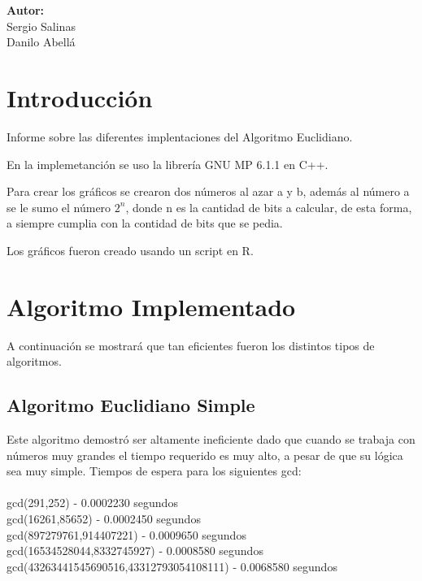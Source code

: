 \documentclass[12pt,letterpaper]{scrartcl}
\begin{document}
\begin{titlepage}
\begin{center}
\begin{minipage}[l]{0.4\textwidth}
	\begin{flushright}

		\textbf{\textsf{Autor:}}\\
		\linespread{1}
		\large Sergio Salinas\\
		\large Danilo Abellá\\

	\end{flushright}
\end{minipage}

\end{center}

\end{titlepage}



\newpage
\section*{Introducción}

Informe sobre las diferentes implentaciones del Algoritmo Euclidiano.

En la implemetanción se uso la librería GNU MP 6.1.1 en C++.

Para crear los gráficos se crearon dos números al azar a y b, además al número a se le sumo el número $2^n$, donde n es la cantidad de bits a calcular, de esta forma, a siempre cumplia con la contidad de bits que se pedia.

Los gráficos fueron creado usando un script en R.


\section{Algoritmo Implementado}

A continuación se mostrará que tan eficientes fueron los distintos tipos de algoritmos.

\subsection{Algoritmo Euclidiano Simple}

Este algoritmo demostró ser altamente ineficiente dado que cuando se trabaja con números muy grandes el tiempo requerido es muy alto, a pesar de que su lógica sea muy simple.
Tiempos de espera para los siguientes gcd:
\\\\
gcd(291,252) - 0.0002230 segundos
\\
gcd(16261,85652) - 0.0002450 segundos
\\
gcd(897279761,914407221) - 0.0009650 segundos
\\
gcd(16534528044,8332745927) - 0.0008580 segundos
\\
gcd(43263441545690516,43312793054108111) - 0.0068580 segundos
\end{document}
